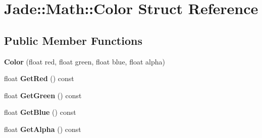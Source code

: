 \hypertarget{struct_jade_1_1_math_1_1_color}{}\section{Jade\+:\+:Math\+:\+:Color Struct Reference}
\label{struct_jade_1_1_math_1_1_color}
\subsection*{Public Member Functions}
\begin{DoxyCompactItemize}
\item 
\hypertarget{struct_jade_1_1_math_1_1_color_a4d6804a2c69e28e33ba7c0b6508d3a13}{}{\bfseries Color} (float red, float green, float blue, float alpha)\label{struct_jade_1_1_math_1_1_color_a4d6804a2c69e28e33ba7c0b6508d3a13}

\item 
\hypertarget{struct_jade_1_1_math_1_1_color_a0902c309c50466a4d091514d1ad185b9}{}float {\bfseries Get\+Red} () const \label{struct_jade_1_1_math_1_1_color_a0902c309c50466a4d091514d1ad185b9}

\item 
\hypertarget{struct_jade_1_1_math_1_1_color_a288ccfc00c16f2fd4f027932671c5d43}{}float {\bfseries Get\+Green} () const \label{struct_jade_1_1_math_1_1_color_a288ccfc00c16f2fd4f027932671c5d43}

\item 
\hypertarget{struct_jade_1_1_math_1_1_color_a06f9cd57dbaa7c4f63a29c0c4ac20002}{}float {\bfseries Get\+Blue} () const \label{struct_jade_1_1_math_1_1_color_a06f9cd57dbaa7c4f63a29c0c4ac20002}

\item 
\hypertarget{struct_jade_1_1_math_1_1_color_a088502e04369cba558d990447d25c56b}{}float {\bfseries Get\+Alpha} () const \label{struct_jade_1_1_math_1_1_color_a088502e04369cba558d990447d25c56b}

\end{DoxyCompactItemize}
